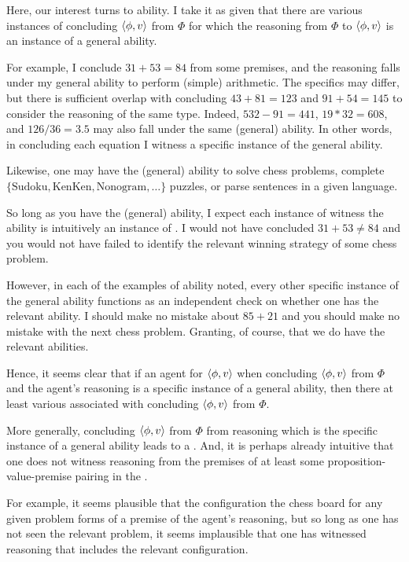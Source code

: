 \begin{note}[Ability]
  Here, our interest turns to ability.
  I take it as given that there are various instances of concluding \(\langle \phi, v \rangle\) from \(\Phi\) for which the reasoning from \(\Phi\) to \(\langle \phi, v \rangle\) is an instance of a general ability.

  For example, I conclude \(31 + 53 = 84\) from some premises, and the reasoning falls under my general ability to perform (simple) arithmetic.
  The specifics may differ, but there is sufficient overlap with concluding \(43 + 81 = 123\) and \(91 + 54 = 145\) to consider the reasoning of the same type.
  Indeed, \(532 - 91 = 441\), \(19 * 32 = 608\), and \(126/36 = 3.5\) may also fall under the same (general) ability.
  In other words, in concluding each equation I witness a specific instance of the general ability.

  Likewise, one may have the (general) ability to solve chess problems, complete \(\{ \text{Sudoku}, \text{KenKen}, \text{Nonogram}, \dots\}\) puzzles, or parse sentences in a given language.

  So long as you have the (general) ability, I expect each instance of witness the ability is intuitively an instance of \csN{}.
  I would not have concluded \(31 + 53 \ne 84\) and you would not have failed to identify the relevant winning strategy of some chess problem.

  However, in each of the examples of ability noted, every other specific instance of the general ability functions as an independent check on whether one has the relevant ability.
  I should make no mistake about \(85 + 21\) and you should make no mistake with the next chess problem.
  Granting, of course, that we do have the relevant abilities.

  Hence, it seems clear that if an agent \csV{} for \(\langle \phi, v \rangle\) when concluding \(\langle \phi, v \rangle\) from \(\Phi\) and the agent's reasoning is a specific instance of a general ability, then there at least various  associated with concluding \(\langle \phi, v \rangle\) from \(\Phi\).

  More generally, concluding \(\langle \phi, v \rangle\) from \(\Phi\) from reasoning which is the specific instance of a general ability leads to a \cluster{}.
  And, it is perhaps already intuitive that one does not witness reasoning from the premises of at least some proposition-value-premise pairing in the \cluster{}.

  For example, it seems plausible that the configuration the chess board for any given problem forms of a premise of the agent's reasoning, but so long as one has not seen the relevant problem, it seems implausible that one has witnessed reasoning that includes the relevant configuration.


\end{note}
